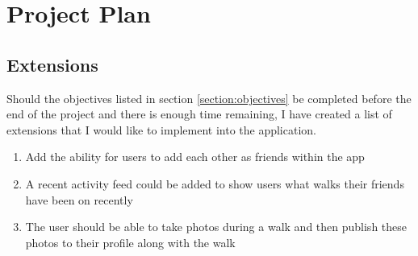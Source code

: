 \chapter{Project Plan}

\section{Extensions}

Should the objectives listed in section \ref{section:objectives} be completed before the end of the project and there is enough time remaining, I have created a list of extensions that I would like to implement into the application.

\begin{enumerate}[label=\textbf{Ext \arabic*}]
  \item Add the ability for users to add each other as friends within the app
  \item A recent activity feed could be added to show users what walks their friends have been on recently
  \item The user should be able to take photos during a walk and then publish these photos to their profile along with the walk
\end{enumerate}